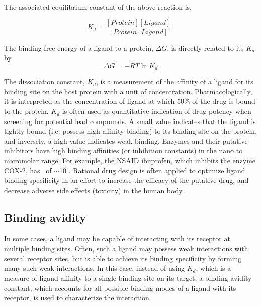 The associated equilibrium constant of the above reaction is,

 \begin{equation}
  K_{d} = \frac{\left[ Protein \right]\left[ Ligand \right]}{\left[Protein \cdot Ligand\right]},
 \end{equation}
   
The binding free energy of a ligand to a protein, $\Delta G$, is directly related to its $K_{d}$ by 
\begin{equation}
	\Delta G = -RT\ln K_{d}
\end{equation}

The dissociation constant, $K_d$, is a measurement of the affinity of a ligand for its binding site on the host protein with a unit of concentration. Pharmacologically, it is interpreted as the concentration of ligand at which 50\% of the drug is bound to the protein. $K_d$ is often used as quantitative indication of drug potency when screening for potential lead compounds.
A small value indicates that the ligand is tightly bound (i.e. possess high affinity binding) to its binding site on the protein, and inversely, a high value indicates weak binding. Enzymes and their putative inhibitors have high binding affinities (or inhibition constants) in the nano to micromolar range. For example, the NSAID ibuprofen, which inhibits the enzyme COX-2, has \KD\ of $\sim$10 \micromolar.\cite{Cryer:1998ti} Rational drug design is often applied to optimize ligand binding specificity in an effort to increase the efficacy of the putative drug, and decrease adverse side effects (toxicity) in the human body.

\subsection{Binding avidity}
In some cases, a ligand may be capable of interacting with its receptor at multiple binding sites. Often, such a ligand may possess weak interactions with several receptor sites, but is able to achieve its binding specificity by forming many such weak interactions. In this case, instead of using $K_{d}$, which is a measure of ligand affinity to a single binding site on its target, a binding avidity constant, which accounts for all possible binding modes of a ligand with its receptor, is used to characterize the interaction.

